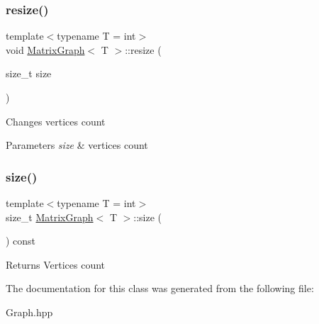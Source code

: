 \subsubsection{\texorpdfstring{resize()}{resize()}}
{\footnotesize\ttfamily template$<$typename T = int$>$ \\
void \hyperlink{class_matrix_graph}{Matrix\+Graph}$<$ T $>$\+::resize (\begin{DoxyParamCaption}\item[{size\+\_\+t}]{size }\end{DoxyParamCaption})\hspace{0.3cm}{\ttfamily [inline]}}

Changes vertices count 
\begin{DoxyParams}{Parameters}
{\em size} & vertices count \\
\hline
\end{DoxyParams}
\mbox{\label{class_matrix_graph_acb1c06541182d4bb472c9813942a75b0}} 
\subsubsection{\texorpdfstring{size()}{size()}}
{\footnotesize\ttfamily template$<$typename T = int$>$ \\
size\+\_\+t \hyperlink{class_matrix_graph}{Matrix\+Graph}$<$ T $>$\+::size (\begin{DoxyParamCaption}{ }\end{DoxyParamCaption}) const\hspace{0.3cm}{\ttfamily [inline]}}

\begin{DoxyReturn}{Returns}
Vertices count 
\end{DoxyReturn}


The documentation for this class was generated from the following file\+:\begin{DoxyCompactItemize}
\item 
Graph.\+hpp\end{DoxyCompactItemize}
